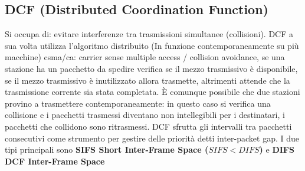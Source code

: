 \documentclass{article}
\begin{document}
\subsection{DCF (Distributed Coordination Function)}
Si occupa di: evitare interferenze tra trasmissioni simultanee (collisioni). DCF a sua volta utilizza l’algoritmo distribuito (In funzione contemporaneamente su più macchine) csma/ca: carrier sense multiple access / collision avoidance, se una stazione ha un pacchetto da spedire verifica se il mezzo trasmissivo è disponibile, se il mezzo trasmissivo è inutilizzato allora trasmette, altrimenti attende che la trasmissione corrente sia stata completata. È comunque possibile che due stazioni provino a trasmettere contemporaneamente: in questo caso si verifica una collisione e i pacchetti trasmessi diventano non intellegibili per i destinatari, i pacchetti che collidono sono ritrasmessi. DCF sfrutta gli intervalli tra pacchetti consecutivi come strumento per gestire delle priorità detti inter-packet gap. I due tipi principali sono \textbf{SIFS Short Inter-Frame Space ($SIFS<DIFS$)} e \textbf{DIFS DCF Inter-Frame Space}
\end{document}
